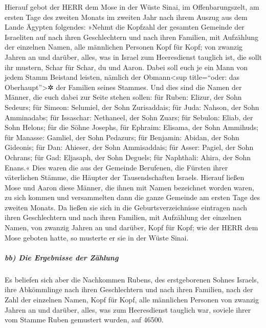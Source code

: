 Hierauf gebot der HERR dem Mose in der Wüste Sinai, im
Offenbarungszelt, am ersten Tage des zweiten Monats im zweiten Jahr nach
ihrem Auszug aus dem Lande Ägypten folgendes: »Nehmt die
Kopfzahl der gesamten Gemeinde der Israeliten auf nach ihren
Geschlechtern und nach ihren Familien, mit Aufzählung der einzelnen
Namen, alle männlichen Personen Kopf für Kopf; von zwanzig
Jahren an und darüber, alles, was in Israel zum Heeresdienst tauglich
ist, die sollt ihr mustern, Schar für Schar, du und Aaron.
Dabei soll euch je ein Mann von jedem Stamm Beistand
leisten, nämlich der Obmann\textless sup title=``oder: das
Oberhaupt''\textgreater✲ der Familien seines Stammes. Und
dies sind die Namen der Männer, die euch dabei zur Seite stehen sollen:
für Ruben: Elizur, der Sohn Sedeurs; für Simeon: Selumiel,
der Sohn Zurisaddais; für Juda: Nahson, der Sohn
Amminadabs; für Issaschar: Nethaneel, der Sohn Zuars;
für Sebulon: Eliab, der Sohn Helons; für
die Söhne Josephs, für Ephraim: Elisama, der Sohn Ammihuds; für Manasse:
Gamliel, der Sohn Pedazurs; für Benjamin: Abidan, der
Sohn Gideonis; für Dan: Ahieser, der Sohn Ammisaddais;
für Asser: Pagiel, der Sohn Ochrans; für
Gad: Eljasaph, der Sohn Deguels; für Naphthali: Ahira,
der Sohn Enans.« Dies waren die aus der Gemeinde
Berufenen, die Fürsten ihrer väterlichen Stämme, die Häupter der
Tausendschaften Israels. Hierauf ließen Mose und Aaron
diese Männer, die ihnen mit Namen bezeichnet worden waren, zu sich
kommen und versammelten dann die ganze Gemeinde am ersten
Tage des zweiten Monats. Da ließen sie sich in die Geburtsverzeichnisse
eintragen nach ihren Geschlechtern und nach ihren Familien, mit
Aufzählung der einzelnen Namen, von zwanzig Jahren an und darüber, Kopf
für Kopf; wie der HERR dem Mose geboten hatte, so
musterte er sie in der Wüste Sinai.

\hypertarget{bb-die-ergebnisse-der-zuxe4hlung}{%
\subparagraph{bb) Die Ergebnisse der
Zählung}\label{bb-die-ergebnisse-der-zuxe4hlung}}

Es beliefen sich aber die Nachkommen Rubens, des
erstgeborenen Sohnes Israels, ihre Abkömmlinge nach ihren Geschlechtern
und nach ihren Familien, nach der Zahl der einzelnen Namen, Kopf für
Kopf, alle männlichen Personen von zwanzig Jahren an und darüber, alles,
was zum Heeresdienst tauglich war, soviele ihrer vom
Stamme Ruben gemustert wurden, auf 46500.

